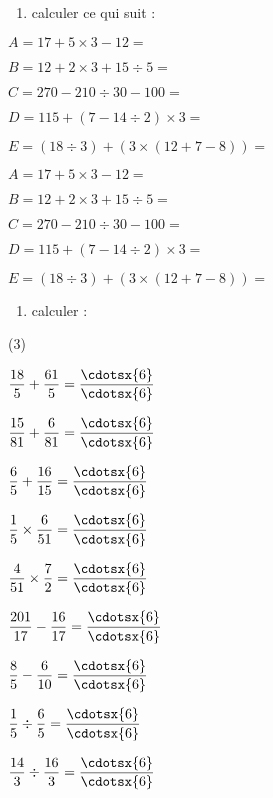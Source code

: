 \documentclass[a4paper,12pt]{article}
\begin{document}
\devoir[prv=false,ds=false,sem=1,num=1 ,niv=1 ,date=12/10/2022,rdate=19/10/2022]

\begin{exo}
\begin{enumerate}[font=\bfseries]
		\item calculer ce qui suit :
\end{enumerate}	
\begin{multicols}{2}	
$ A=17+5\times 3-12=$\anserline[3]

$ B=12+2\times 3+15\div 5=$\anserline[3]

$ C=270-210\div 30-100=$\anserline[3]

$ D=115+(7-14\div 2)\times 3=$\anserline[3]

$ E=(18\div 3)+(3\times(12+7-8))=$\anserline[3]\columnbreak
		
$ A=17+5\times 3-12=$\anserline[3]

$ B=12+2\times 3+15\div 5=$\anserline[3]

$ C=270-210\div 30-100=$\anserline[3]

$ D=115+(7-14\div 2)\times 3=$\anserline[3]

$ E=(18\div 3)+(3\times(12+7-8))=$\anserline[3]
	\end{multicols}
\end{exo}

\begin{exo}
	\begin{enumerate}[font=\bfseries]
		\item calculer :
		\end{enumerate}
\begin{tasks}(3)

\task\(\dfrac{18}{5}+\dfrac{61}{5}=\dfrac{\cdotsx{6}}{\cdotsx{6}}\)

\task\(\dfrac{15}{81}+\dfrac{6}{81}=\dfrac{\cdotsx{6}}{\cdotsx{6}}\)

\task\(\dfrac{6}{5}+\dfrac{16}{15}=\dfrac{\cdotsx{6}}{\cdotsx{6}}\)

\task\(\dfrac{1}{5}\times \dfrac{6}{51}=\dfrac{\cdotsx{6}}{\cdotsx{6}}\)

\task\(\dfrac{4}{51}\times\dfrac{7}{2}=\dfrac{\cdotsx{6}}{\cdotsx{6}}\)

\task\(\dfrac{201}{17}-\dfrac{16}{17}=\dfrac{\cdotsx{6}}{\cdotsx{6}}\)

\task\(\dfrac{8}{5}-\dfrac{6}{10}=\dfrac{\cdotsx{6}}{\cdotsx{6}}\)

\task\(\dfrac{1}{5}\div\dfrac{6}{5}=\dfrac{\cdotsx{6}}{\cdotsx{6}}\)

\task\(\dfrac{14}{3}\div\dfrac{16}{3}=\dfrac{\cdotsx{6}}{\cdotsx{6}}\)	
\end{tasks}
\vspace{10pt}	
\end{exo}
\end{document}
